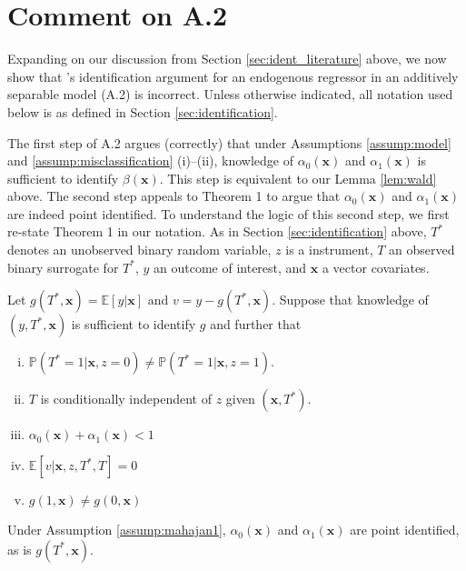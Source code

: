 \section{Comment on \cite{Mahajan} A.2}
\label{sec:mahajan}
Expanding on our discussion from Section \ref{sec:ident_literature} above, we now show that \citeauthor{Mahajan}'s identification argument for an endogenous regressor in an additively separable model (A.2) is incorrect.
Unless otherwise indicated, all notation used below is as defined in Section \ref{sec:identification}.

The first step of \cite{Mahajan} A.2 argues (correctly) that under Assumptions \ref{assump:model} and \ref{assump:misclassification} (i)--(ii), knowledge of $\alpha_0(\mathbf{x})$ and $\alpha_1(\mathbf{x})$ is sufficient to identify $\beta(\mathbf{x})$. 
This step is equivalent to our Lemma \ref{lem:wald} above.
The second step appeals to \cite{Mahajan} Theorem 1 to argue that $\alpha_0(\mathbf{x})$ and $\alpha_1(\mathbf{x})$ are indeed point identified.
To understand the logic of this second step, we first re-state \cite{Mahajan} Theorem 1 in our notation.
As in Section \ref{sec:identification} above, $T^*$ denotes an unobserved binary random variable, $z$ is a instrument, $T$ an observed binary surrogate for $T^*$, $y$ an outcome of interest, and $\mathbf{x}$ a vector covariates.

\begin{assump}
  Let $g(T^*, \mathbf{x}) = \mathbb{E}[y|\mathbf{x}]$ and $v = y - g(T^*,\mathbf{x})$.
  Suppose that knowledge of $(y,T^*,\mathbf{x})$ is sufficient to identify $g$ and further that
  \begin{enumerate}[(i)]
    \item $\mathbb{P}(T^*=1|\mathbf{x},z=0) \neq \mathbb{P}(T^*=1|\mathbf{x},z=1)$.
    \item $T$ is conditionally independent of $z$ given $(\mathbf{x}, T^*)$.
    \item $\alpha_0(\mathbf{x}) + \alpha_1(\mathbf{x}) < 1$
    \item $\mathbb{E}[v|\mathbf{x},z,T^*,T] = 0$
    \item $g(1,\mathbf{x}) \neq g(0, \mathbf{x})$
  \end{enumerate}
  \label{assump:mahajan1}
\end{assump}

\begin{thm}
  Under Assumption \ref{assump:mahajan1}, $\alpha_0(\mathbf{x})$ and $\alpha_1(\mathbf{x})$ are point identified, as is $g(T^*,\mathbf{x})$.
  \label{thm:mahajan1}
\end{thm}

